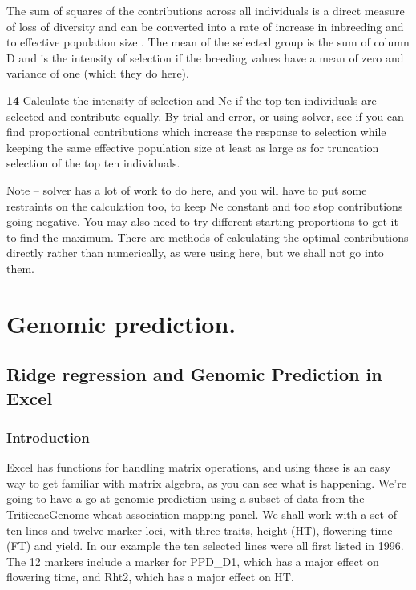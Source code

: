 \documentclass[
]{book}
\makeatletter
\newenvironment{kframe}{%
\medskip{}
\setlength{\fboxsep}{.8em}
 \def\at@end@of@kframe{}%
 \ifinner\ifhmode%
  \def\at@end@of@kframe{\end{minipage}}%
  \begin{minipage}{\columnwidth}%
 \fi\fi%
 \def\FrameCommand##1{\hskip\@totalleftmargin \hskip-\fboxsep
 \colorbox{shadecolor}{##1}\hskip-\fboxsep
     \hskip-\linewidth \hskip-\@totalleftmargin \hskip\columnwidth}%
 \MakeFramed {\advance\hsize-\width
   \@totalleftmargin\z@ \linewidth\hsize
   \@setminipage}}%
 {\par\unskip\endMakeFramed%
 \at@end@of@kframe}
\newenvironment{rmdblock}[1]
  {
  \begin{itemize}
  \renewcommand{\labelitemi}{
    \raisebox{-.7\height}[0pt][0pt]{
      {\setkeys{Gin}{width=3em,keepaspectratio}\texttt{[image: images/\#1]}}
    }
  }
  \setlength{\fboxsep}{1em}
  \begin{kframe}
  \item
  }
  {
  \end{kframe}
  \end{itemize}
  }
\newenvironment{rmdnote}
  {\begin{rmdblock}{note}}
  {\end{rmdblock}}
\newenvironment{rmdquiz}
  {\begin{rmdblock}{quiz}}
  {\end{rmdblock}}
\makeatother
\begin{document}
The sum of squares of the contributions across all individuals is a direct measure of loss of diversity and can be converted into a rate of increase in inbreeding and to effective population size \citep{mackay_accelerated_1999}. The mean of the selected group is the sum of column D and is the intensity of selection if the breeding values have a mean of zero and variance of one (which they do here).

\begin{rmdquiz}
\textbf{14}
Calculate the intensity of selection and Ne if the top ten individuals are selected and contribute equally. By trial and error, or using solver, see if you can find proportional contributions which increase the response to selection while keeping the same effective population size at least as large as for truncation selection of the top ten individuals.
\end{rmdquiz}

\begin{rmdnote}
Note -- solver has a lot of work to do here, and you will have to put some restraints on the calculation too, to keep Ne constant and too stop contributions going negative. You may also need to try different starting proportions to get it to find the maximum. There are methods of calculating the optimal contributions directly rather than numerically, as were using here, but we shall not go into them.
\end{rmdnote}

\hypertarget{Genomic-prediction}{%
\chapter{Genomic prediction.}\label{Genomic-prediction}}

\hypertarget{ridge-regression-and-genomic-prediction-in-excel}{%
\section{Ridge regression and Genomic Prediction in Excel}\label{ridge-regression-and-genomic-prediction-in-excel}}

\hypertarget{introduction-4}{%
\subsection{Introduction}\label{introduction-4}}

Excel has functions for handling matrix operations, and using these is an easy way to get familiar with matrix algebra, as you can see what is happening. We're going to have a go at genomic prediction using a subset of data from the TriticeaeGenome wheat association mapping panel. We shall work with a set of ten lines and twelve marker loci, with three traits, height (HT), flowering time (FT) and yield. In our example the ten selected lines were all first listed in 1996. The 12 markers include a marker for PPD\_D1, which has a major effect on flowering time, and Rht2, which has a major effect on HT.
\end{document}
